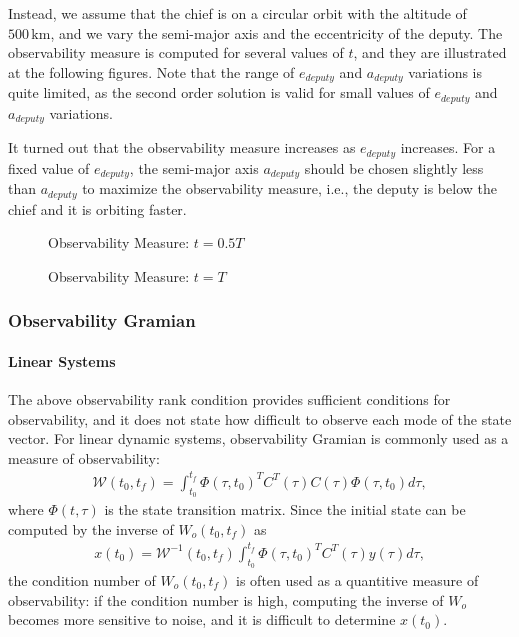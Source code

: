 \documentclass[10pt]{article}
\begin{document}
Instead, we assume that the chief is on a circular orbit with the altitude of $500\,\mathrm{km}$, and we vary the semi-major axis and the eccentricity of the deputy. The observability measure is computed for several values of $t$, and they are illustrated at the following figures. Note that the range of $e_{deputy}$ and $a_{deputy}$ variations is quite limited, as the second order solution is valid for small values of $e_{deputy}$ and $a_{deputy}$ variations.

It turned out that the observability measure increases as $e_{deputy}$ increases. For a fixed value of $e_{deputy}$, the semi-major axis $a_{deputy}$ should be chosen slightly less than $a_{deputy}$ to maximize the observability measure, i.e., the deputy is below the chief and it is orbiting faster. 


\clearpage\newpage

\begin{figure}[h!]
\centerline{
	\hfill
}
\caption{Observability Measure: $t=0.5T$}
\end{figure}
\begin{figure}[h!]
\centerline{
	\hfill
}
\caption{Observability Measure: $t=T$}
\end{figure}

\subsubsection{Observability Gramian}\label{sec:OM}

\paragraph{Linear Systems} The above observability rank condition provides sufficient conditions for observability, and it does not state how difficult to observe each mode of the state vector. For linear dynamic systems, observability Gramian is commonly used as a measure of observability:
\begin{align}
\mathcal{W}(t_0,t_f) = \int_{t_0}^{t_f}\Phi(\tau,t_0)^T C^T(\tau)  C(\tau) \Phi(\tau,t_0) d\tau,\label{eqn:Wo_Lin}
\end{align}
where $\Phi(t,\tau)$ is the state transition matrix. Since the initial state can be computed by the inverse of $W_o(t_0,t_f)$ as 
\begin{align*}
x(t_0) = \mathcal{W}^{-1}(t_0,t_f)\int_{t_0}^{t_f}\Phi(\tau,t_0)^T C^T(\tau)  y(\tau) d\tau,
\end{align*}
the condition number of $W_o(t_0,t_f)$ is often used as a quantitive measure of observability: if the condition number is high, computing the inverse of $W_o$ becomes more sensitive to noise, and it is difficult to determine $x(t_0)$.
\end{document}
